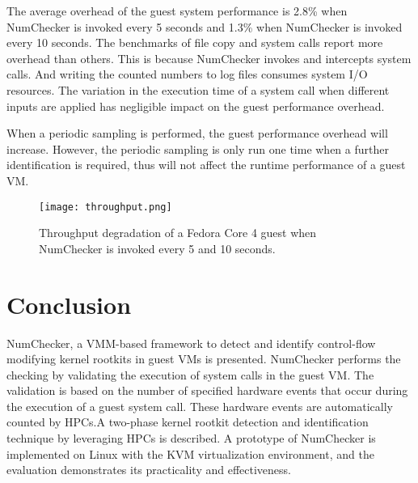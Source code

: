 \documentclass[12pt]{report}
\begin{document}
The average overhead of the guest system performance is
2.8\% when NumChecker is invoked every 5 seconds and 1.3\%
when NumChecker is invoked every 10 seconds. The benchmarks
of file copy and system calls report more overhead than
others. This is because NumChecker invokes and intercepts
system calls. And writing the counted numbers to log files
consumes system I/O resources. The variation in the execution
time of a system call when different inputs are applied has
negligible impact on the guest performance overhead.

When a periodic sampling is performed, the guest performance
overhead will increase. However, the periodic sampling
is only run one time when a further identification is required,
thus will not affect the runtime performance of a guest VM.

\begin{figure}[h]
\centering
\texttt{[image: throughput.png]}
\caption{Throughput degradation of a Fedora Core 4 guest when
NumChecker is invoked every 5 and 10 seconds. }
\end{figure}

\chapter{Conclusion}
\label {con}
NumChecker, a VMM-based
framework to detect and identify control-flow modifying kernel
rootkits in guest VMs is presented. NumChecker performs the checking
by validating the execution of system calls in the guest VM.
The validation is based on the number of specified hardware
events that occur during the execution of a guest system call.
These hardware events are automatically counted by HPCs.A two-phase kernel rootkit detection and identification
technique by leveraging HPCs is described. A prototype of NumChecker
is implemented on Linux with the KVM virtualization environment,
and the evaluation demonstrates its practicality and
effectiveness.   
   
\end{document}
